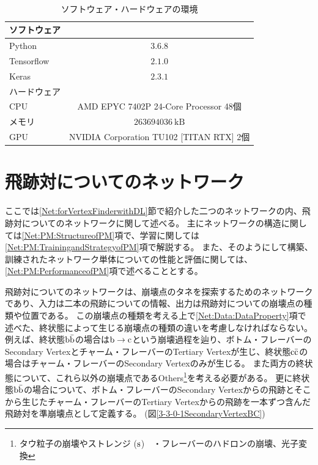\begin{table}[htb]
 \centering
　\small
  \begin{tabular}{l c} \hline
    ソフトウェア&\\\hline\hline
    Python & $3.6.8$\\
    Tensorflow & $2.1.0$\\
    Keras & $2.3.1$\\\hline
    ハードウェア &\\\hline\hline
    CPU& AMD EPYC 7402P 24-Core Processor 48個\\
    メモリ & $263694036\ \mathrm{kB}$\\
    GPU & NVIDIA Corporation TU102 [TITAN RTX] 2個\\\hline
  \end{tabular}
  \caption{ソフトウェア・ハードウェアの環境}
  \label{SoftwareHardwareEnvironments}
\end{table}


\section{飛跡対についてのネットワーク} \label{Net:PairModel}

ここでは\ref{Net:forVertexFinderwithDL}節で紹介した二つのネットワークの内、飛跡対についてのネットワークに関して述べる。
主にネットワークの構造に関しては\ref{Net:PM:StructureofPM}項で、学習に関しては\ref{Net:PM:TrainingandStrategyofPM}項で解説する。
また、そのようにして構築、訓練されたネットワーク単体についての性能と評価に関しては、\ref{Net:PM:PerformanceofPM}項で述べることとする。

飛跡対についてのネットワークは、崩壊点のタネを探索するためのネットワークであり、入力は二本の飛跡についての情報、出力は飛跡対についての崩壊点の種類や位置である。
この崩壊点の種類を考える上で\ref{Net:Data:DataProperty}項で述べた、終状態によって生じる崩壊点の種類の違いを考慮しなければならない。
例えば、終状態$\rm b\bar{b}$の場合は$\rm b \to c$という崩壊過程を辿り、ボトム・フレーバーのSecondary Vertexとチャーム・フレーバーのTertiary Vertexが生じ、終状態$\rm c\bar{c}$の場合はチャーム・フレーバーのSecondary Vertexのみが生じる。
また両方の終状態について、これら以外の崩壊点であるOthers\footnote{タウ粒子の崩壊やストレンジ ($\rm s$)　・フレーバーのハドロンの崩壊、光子変換}を考える必要がある。
更に終状態$\rm b\bar{b}$の場合について、ボトム・フレーバーのSecondary Vertexからの飛跡とそこから生じたチャーム・フレーバーのTertiary Vertexからの飛跡を一本ずつ含んだ飛跡対を準崩壊点として定義する。 (図\ref{3-3-0-1SecondaryVertexBC}) 

